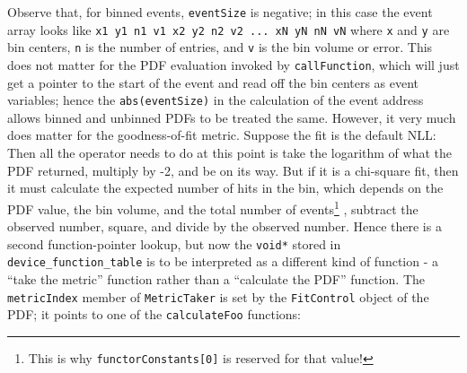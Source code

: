 \documentclass[12pt,pdflatex]{article}
\begin{document}
Observe that, for binned events, \texttt{eventSize} is negative; in this case
the event array looks like \verb|x1 y1 n1 v1 x2 y2 n2 v2 ... xN yN nN vN| where
\texttt{x} and \texttt{y} are bin centers, \texttt{n} is the number of entries, 
and \texttt{v} is the bin volume or error. This does not matter for the PDF evaluation
invoked by \texttt{callFunction}, which will just get a pointer to the start of
the event and read off the bin centers as event variables; hence the \verb|abs(eventSize)|
in the calculation of the event address allows binned and unbinned PDFs to be 
treated the same. However, it very much does matter for the goodness-of-fit metric.
Suppose the fit is the default NLL: Then all the operator needs to do at this
point is take the logarithm of what the PDF returned, multiply by -2, and be
on its way. But if it is a chi-square fit, then it must calculate the expected
number of hits in the bin, which depends on the PDF value, the bin volume,
and the total number of events\footnote{This is why \texttt{functorConstants[0]} is reserved for that value!}
, subtract the observed number, square, and divide by the observed
number. Hence there is a second function-pointer lookup, but now the \verb|void*|
stored in \verb|device_function_table| is to be interpreted as a different kind
of function - a ``take the metric'' function rather than a ``calculate the PDF''
function. The \verb|metricIndex| member of \verb|MetricTaker| is set by the \texttt{FitControl}
object of the PDF; it points to one of the \texttt{calculateFoo} functions:
\end{document}
